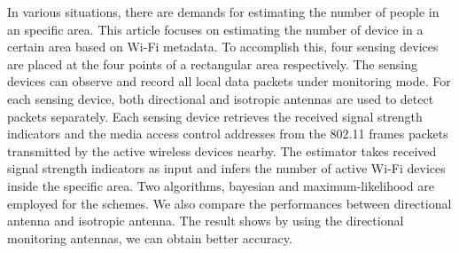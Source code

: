 \TAMUAbstractFormat

In various situations, there are demands for estimating the number of people in an specific area. This article focuses on estimating the number of device in a certain area based on Wi-Fi metadata. To accomplish this, four sensing devices are placed at the four points of a rectangular area respectively. The sensing devices can observe and record all local data packets under monitoring mode. For each sensing device, both directional and isotropic antennas are used to detect packets separately. Each sensing device retrieves the received signal strength indicators and the media access control  addresses from the 802.11 frames packets transmitted by the active wireless devices nearby.
The estimator takes received signal strength indicators as input and infers the number of active Wi-Fi devices inside the specific area. Two algorithms, bayesian and maximum-likelihood are employed for the schemes.
We also compare the performances between directional antenna and isotropic antenna. The result shows by using the directional monitoring antennas, we can obtain better accuracy.
